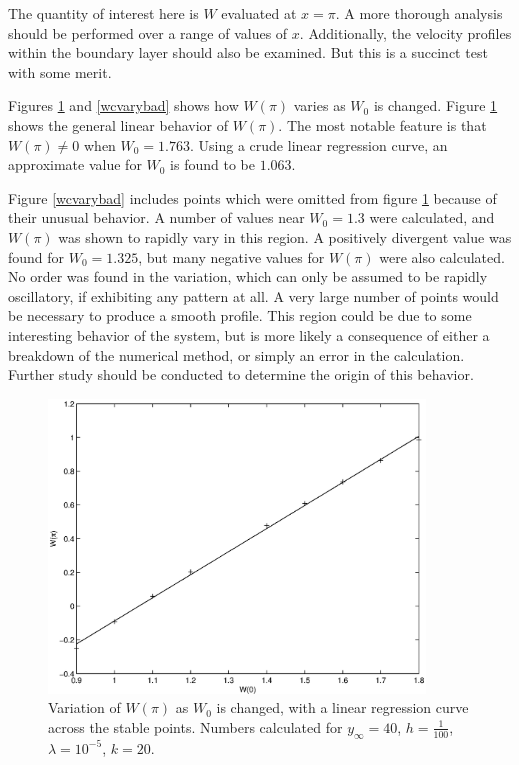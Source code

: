 \documentclass[10pt,a4paper]{report}
\begin{document}
The quantity of interest here is $W$ evaluated at $x=\pi$. A more thorough analysis should be performed over a range of values of $x$. Additionally, the velocity profiles within the boundary layer should also be examined. But this is a succinct test with some merit.

Figures \ref{wcvary} and \ref{wcvarybad} shows how $W(\pi)$ varies as $W_0$ is changed. Figure \ref{wcvary} shows the general linear behavior of $W(\pi)$. The most notable feature is that $W(\pi) \neq 0$ when $W_0 = 1.763$. Using a crude linear regression curve, an approximate value for $W_0$ is found to be $1.063$.

Figure \ref{wcvarybad} includes points which were omitted from figure \ref{wcvary} because of their unusual behavior. A number of values near $W_0 = 1.3$ were calculated, and $W(\pi)$ was shown to rapidly vary in this region. A positively divergent value was found for $W_0 = 1.325$, but many negative values for $W(\pi)$ were also calculated. No order was found in the variation, which can only be assumed to be rapidly oscillatory, if exhibiting any pattern at all. A very large number of points would be necessary to produce a smooth profile. This region could be due to some interesting behavior of the system, but is more likely a consequence of either a breakdown of the numerical method, or simply an error in the calculation. Further study should be conducted to determine the origin of this behavior.

\clearpage

\begin{figure}[tp]
\centering
\includegraphics[width=10cm]{pics/wcpi.eps}
\caption[Plot of $W(\pi)$ versus $W_0$]{Variation of $W(\pi)$ as $W_0$ is changed, with a linear regression curve across the stable points. Numbers calculated for $y_\infty = 40$, $h = \frac{1}{100}$, $\lambda = 10^{-5}$, $k=20$.}
\label{wcvary}
\end{figure}
\end{document}
